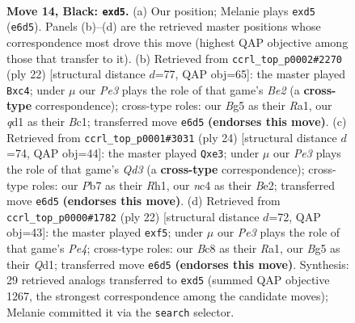 \documentclass[11pt]{article}
\begin{document}
\clearpage

\begin{figure}[p]\centering
\begin{subfigure}{0.46\textwidth}\centering
\resizebox{\linewidth}{!}{%
\newchessgame
\chessboard[
  setfen={r1bqr1k1/1pp2p1p/2n1p3/p2B2b1/2NP4/4P1P1/PP3P2/RNBQR1K1 b - - 0 14},
  showmover=false,
  pgfstyle=straightmove, color=movearrow, markmove={e6-d5}
]}
\caption{}
\end{subfigure}\hfill
\begin{subfigure}{0.46\textwidth}\centering
\resizebox{\linewidth}{!}{%
\newchessgame
\chessboard[
  setfen={r1b1k2r/1p3ppp/p3pn2/2bq4/2nN4/1PP5/P3BPPP/R1BQ1RK1 w kq - 0 12},
  showmover=false,
  pgfstyle=straightmove, color=movearrow, markmove={e2-c4}
]}
\caption{}
\end{subfigure}
\\[4pt]
\begin{subfigure}{0.46\textwidth}\centering
\resizebox{\linewidth}{!}{%
\newchessgame
\chessboard[
  setfen={r1bq1rk1/pp3p1p/3p1np1/4p3/2P1P3/2NQb2P/PP2BPP1/R3K2R w KQ - 0 13},
  showmover=false,
  pgfstyle=straightmove, color=movearrow, markmove={d3-e3}
]}
\caption{}
\end{subfigure}\hfill
\begin{subfigure}{0.46\textwidth}\centering
\resizebox{\linewidth}{!}{%
\newchessgame
\chessboard[
  setfen={rn1qk2r/1p2ppb1/p2p3p/4nbp1/4P3/2N3BP/PPP2PP1/R2QKB1R w KQkq - 0 12},
  showmover=false,
  pgfstyle=straightmove, color=movearrow, markmove={e4-f5}
]}
\caption{}
\end{subfigure}
\caption{\textbf{Move 14, Black: \texttt{exd5}.} (a) Our position; Melanie plays \texttt{exd5} (\texttt{e6d5}). Panels (b)--(d) are the retrieved master positions whose correspondence most drove this move (highest QAP objective among those that transfer to it). (b) Retrieved from \texttt{ccrl\_top\_p0002\#2270} (ply 22) [structural distance $d$=77, QAP obj=65]: the master played \texttt{Bxc4}; under $\mu$ our \emph{Pe3} plays the role of that game's \emph{Be2} (a \textbf{cross-type} correspondence); cross-type roles: our \emph{B}g5 as their \emph{R}a1, our \emph{q}d1 as their \emph{B}c1; transferred move \texttt{e6d5} \textbf{(endorses this move)}. (c) Retrieved from \texttt{ccrl\_top\_p0001\#3031} (ply 24) [structural distance $d$=74, QAP obj=44]: the master played \texttt{Qxe3}; under $\mu$ our \emph{Pe3} plays the role of that game's \emph{Qd3} (a \textbf{cross-type} correspondence); cross-type roles: our \emph{P}b7 as their \emph{R}h1, our \emph{n}c4 as their \emph{B}e2; transferred move \texttt{e6d5} \textbf{(endorses this move)}. (d) Retrieved from \texttt{ccrl\_top\_p0000\#1782} (ply 22) [structural distance $d$=72, QAP obj=43]: the master played \texttt{exf5}; under $\mu$ our \emph{Pe3} plays the role of that game's \emph{Pe4}; cross-type roles: our \emph{B}c8 as their \emph{R}a1, our \emph{B}g5 as their \emph{Q}d1; transferred move \texttt{e6d5} \textbf{(endorses this move)}. Synthesis: 29 retrieved analogs transferred to \texttt{exd5} (summed QAP objective 1267, the strongest correspondence among the candidate moves); Melanie committed it via the \texttt{search} selector.}
\label{fig:thought-m27}
\end{figure}
\end{document}
